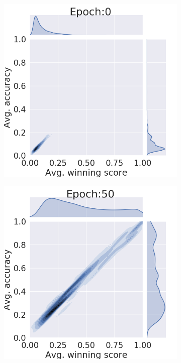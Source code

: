 \begin{figure}[htb]
\begin{subfigure}[b]{0.19\textwidth}
         \caption{}
     \end{subfigure}
         \centering
     \begin{subfigure}[b]{0.19\textwidth}
         \centering
         \noindent\includegraphics[width=\textwidth]{images/joint_plot/mixup/0.png}
         \caption{}
     \end{subfigure}
     \hfill
     \begin{subfigure}[b]{0.19\textwidth}
         \centering
         \noindent\includegraphics[width=\textwidth]{images/joint_plot/mixup/50.png}

\end{subfigure}
\end{figure}
